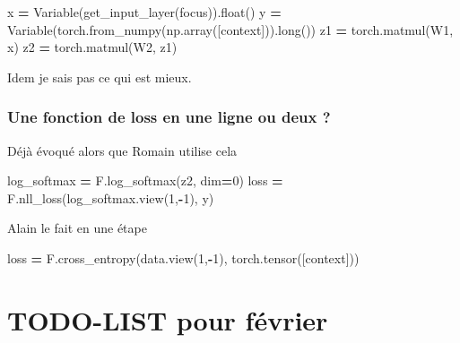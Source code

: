 \documentclass[11pt,french,french]{article}
\newenvironment{Shaded}{\begin{snugshade}}{\end{snugshade}}
\newcommand{\BuiltInTok}[1]{#1}
\newcommand{\DecValTok}[1]{\textcolor[rgb]{0.00,0.00,0.81}{#1}}
\newcommand{\NormalTok}[1]{#1}
\newcommand{\OperatorTok}[1]{\textcolor[rgb]{0.81,0.36,0.00}{\textbf{#1}}}
\begin{document}
\begin{Shaded}
\begin{Highlighting}[]
\NormalTok{x }\OperatorTok{=}\NormalTok{ Variable(get_input_layer(focus)).}\BuiltInTok{float}\NormalTok{()}
\NormalTok{y }\OperatorTok{=}\NormalTok{ Variable(torch.from_numpy(np.array([context])).}\BuiltInTok{long}\NormalTok{())}
\NormalTok{z1 }\OperatorTok{=}\NormalTok{ torch.matmul(W1, x)}
\NormalTok{z2 }\OperatorTok{=}\NormalTok{ torch.matmul(W2, z1)}
\end{Highlighting}
\end{Shaded}

Idem je sais pas ce qui est mieux.

\hypertarget{une-fonction-de-loss-en-une-ligne-ou-deux}{%
\subsubsection{Une fonction de loss en une ligne ou deux
?}\label{une-fonction-de-loss-en-une-ligne-ou-deux}}

Déjà évoqué alors que Romain utilise cela

\begin{Shaded}
\begin{Highlighting}[]
\NormalTok{log_softmax }\OperatorTok{=}\NormalTok{ F.log_softmax(z2, dim}\OperatorTok{=}\DecValTok{0}\NormalTok{)}
\NormalTok{loss }\OperatorTok{=}\NormalTok{ F.nll_loss(log_softmax.view(}\DecValTok{1}\NormalTok{,}\OperatorTok{-}\DecValTok{1}\NormalTok{), y)}
\end{Highlighting}
\end{Shaded}

Alain le fait en une étape

\begin{Shaded}
\begin{Highlighting}[]
\NormalTok{loss }\OperatorTok{=}\NormalTok{ F.cross_entropy(data.view(}\DecValTok{1}\NormalTok{,}\OperatorTok{-}\DecValTok{1}\NormalTok{), torch.tensor([context]))}
\end{Highlighting}
\end{Shaded}

\hypertarget{todo-list-pour-fuxe9vrier}{%
\section{TODO-LIST pour février}\label{todo-list-pour-fuxe9vrier}}
\end{document}
